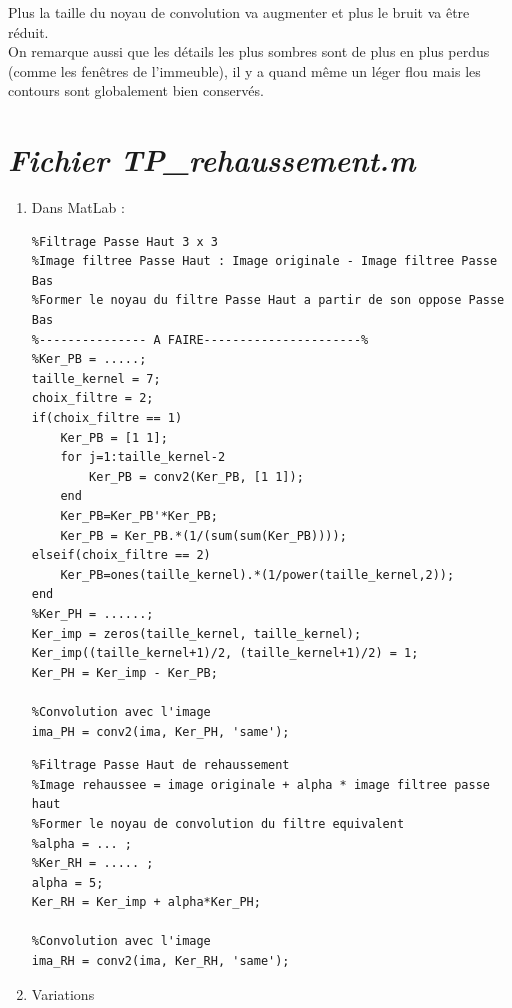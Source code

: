 \documentclass{article}
\begin{document}
\begin{enumerate}[label=\arabic*$\degres$)]
Plus la taille du noyau de convolution va augmenter et plus le bruit va être réduit.\\

On remarque aussi que les détails les plus sombres sont de plus en plus perdus (comme les fenêtres de l'immeuble), il y a quand même un léger flou mais les contours sont globalement bien conservés.

\end{enumerate}

\section*{\it{\textbf{Fichier TP\_rehaussement.m}}}
\begin{enumerate}[label=\arabic*$\degres$)]
	\item Dans MatLab :
\begin{lstlisting}
%Filtrage Passe Haut 3 x 3
%Image filtree Passe Haut : Image originale - Image filtree Passe Bas 
%Former le noyau du filtre Passe Haut a partir de son oppose Passe Bas
%--------------- A FAIRE----------------------%
%Ker_PB = .....; 
taille_kernel = 7;
choix_filtre = 2;
if(choix_filtre == 1)
    Ker_PB = [1 1];
    for j=1:taille_kernel-2
        Ker_PB = conv2(Ker_PB, [1 1]);
    end
    Ker_PB=Ker_PB'*Ker_PB;
    Ker_PB = Ker_PB.*(1/(sum(sum(Ker_PB))));
elseif(choix_filtre == 2)
    Ker_PB=ones(taille_kernel).*(1/power(taille_kernel,2));
end
%Ker_PH = ......;
Ker_imp = zeros(taille_kernel, taille_kernel);
Ker_imp((taille_kernel+1)/2, (taille_kernel+1)/2) = 1;
Ker_PH = Ker_imp - Ker_PB;

%Convolution avec l'image
ima_PH = conv2(ima, Ker_PH, 'same');
\end{lstlisting}
\begin{lstlisting}
%Filtrage Passe Haut de rehaussement 
%Image rehaussee = image originale + alpha * image filtree passe haut
%Former le noyau de convolution du filtre equivalent
%alpha = ... ; 
%Ker_RH = ..... ; 
alpha = 5;
Ker_RH = Ker_imp + alpha*Ker_PH;

%Convolution avec l'image
ima_RH = conv2(ima, Ker_RH, 'same'); 
\end{lstlisting}

	\item Variations
\begin{center}
\end{center}


\end{enumerate}
\end{document}
